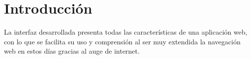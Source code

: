 \section{Introducción}

  \paragraph{}La interfaz desarrollada presenta todas las características de una
  aplicación web, con lo que se facilita su uso y comprensión al ser muy
  extendida la navegación web en estos días gracias al auge de internet.


